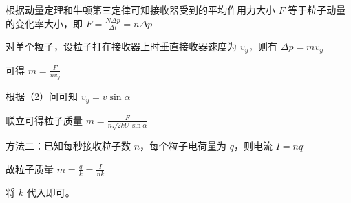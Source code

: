 \documentclass[\gkver]{gaokaozhenti}
\begin{document}
\begin{enumerate}
{根据动量定理和牛顿第三定律可知接收器受到的平均作用力大小 $F$ 等于粒子动量的变化率大小，即 $F = \frac{N\Delta p}{\Delta t} = n\Delta p$

对单个粒子，设粒子打在接收器上时垂直接收器速度为 $v_y$，则有 $\Delta p = mv_y$

可得 $m = \frac{F}{nv_y}$

根据（2）问可知 $v_{y}=v\sin\alpha$

联立可得粒子质量 $m = \frac{F}{n\sqrt{2kU}\sin\alpha}$

方法二：已知每秒接收粒子数 $n$，每个粒子电荷量为 $q$，则电流 $I = nq$

故粒子质量 $m = \frac{q}{k} = \frac{I}{nk}$

将 $k$ 代入即可。
}

\end{enumerate}
\end{document}
